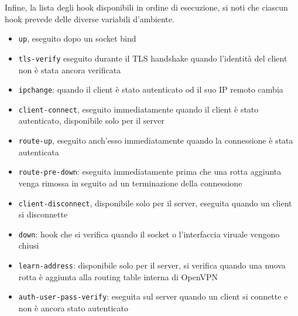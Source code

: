 Infine, la lista degli hook disponibili in ordine di esecuzione, si noti che ciascun hook
prevede delle diverse
variabili d'ambiente.
\begin{itemize}
  \item \texttt{up}, eseguito dopo un socket bind
  \item \texttt{tls-verify} eseguito durante il TLS handshake quando l'identità
  del client non è stata ancora verificata
  \item \texttt{ipchange}: quando il client è stato autenticato od il suo IP remoto
  cambia
  \item \texttt{client-connect}, eseguito immediatamente quando il client è stato
  autenticato, disponibile solo per il server
  \item \texttt{route-up}, eseguito anch'esso immediatamente quando la connessione è stata
  autenticata
  \item \texttt{route-pre-down}: eseguita immediatamente prima che una rotta aggiunta venga
  rimossa in seguito ad un terminazione della connessione
  \item \texttt{client-disconnect}, disponibile solo per il server, eseguita quando
  un client si disconnette
  \item \texttt{down}: hook che si verifica quando il socket o l'interfaccia viruale vengono
  chiusi
  \item \texttt{learn-address}: disponibile solo per il server, si verifica quando una nuova rotta
  è aggiunta alla routing table interna di OpenVPN
  \item \texttt{auth-user-pass-verify}: eseguita sul server quando un client si connette
  e non è ancora stato autenticato
\end{itemize}

